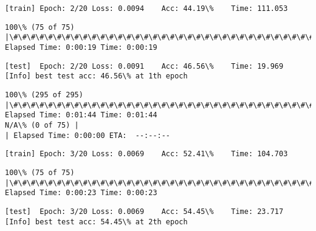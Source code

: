 \documentclass[11pt]{article}
\begin{document}
    \begin{Verbatim}[commandchars=\\\{\}]
[train]	Epoch: 2/20	Loss: 0.0094	Acc: 44.19\%	Time: 111.053

    \end{Verbatim}

    \begin{Verbatim}[commandchars=\\\{\}]
100\% (75 of 75) |\#\#\#\#\#\#\#\#\#\#\#\#\#\#\#\#\#\#\#\#\#\#\#\#\#\#\#\#\#\#\#\#\#\#\#\#\#\#\#\#\#\#\#\#\#\#\#\#\#\#\#\#\#\#\#\#\#\#\#\#\#\#\#\#\#| Elapsed Time: 0:00:19 Time: 0:00:19

    \end{Verbatim}

    \begin{Verbatim}[commandchars=\\\{\}]
[test]	Epoch: 2/20	Loss: 0.0091	Acc: 46.56\%	Time: 19.969
[Info] best test acc: 46.56\% at 1th epoch

    \end{Verbatim}

    \begin{Verbatim}[commandchars=\\\{\}]
100\% (295 of 295) |\#\#\#\#\#\#\#\#\#\#\#\#\#\#\#\#\#\#\#\#\#\#\#\#\#\#\#\#\#\#\#\#\#\#\#\#\#\#\#\#\#\#\#\#\#\#\#\#\#\#\#\#\#\#\#\#\#\#\#\#\#\#\#| Elapsed Time: 0:01:44 Time: 0:01:44
N/A\% (0 of 75) |                                                                 | Elapsed Time: 0:00:00 ETA:  --:--:--
    \end{Verbatim}

    \begin{Verbatim}[commandchars=\\\{\}]
[train]	Epoch: 3/20	Loss: 0.0069	Acc: 52.41\%	Time: 104.703

    \end{Verbatim}

    \begin{Verbatim}[commandchars=\\\{\}]
100\% (75 of 75) |\#\#\#\#\#\#\#\#\#\#\#\#\#\#\#\#\#\#\#\#\#\#\#\#\#\#\#\#\#\#\#\#\#\#\#\#\#\#\#\#\#\#\#\#\#\#\#\#\#\#\#\#\#\#\#\#\#\#\#\#\#\#\#\#\#| Elapsed Time: 0:00:23 Time: 0:00:23

    \end{Verbatim}

    \begin{Verbatim}[commandchars=\\\{\}]
[test]	Epoch: 3/20	Loss: 0.0069	Acc: 54.45\%	Time: 23.717
[Info] best test acc: 54.45\% at 2th epoch

    \end{Verbatim}
\end{document}
